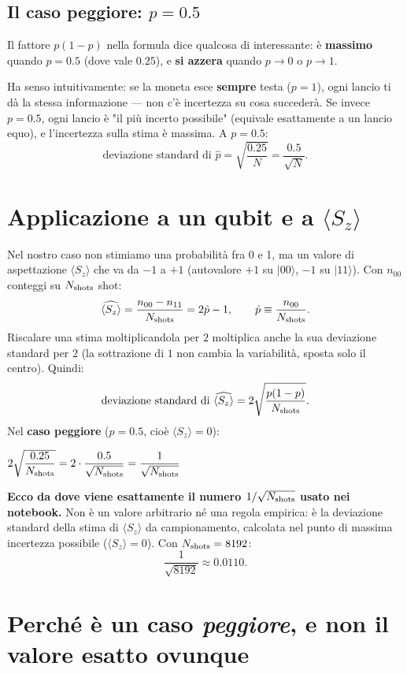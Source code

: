 \documentclass[11pt,a4paper]{article}
\begin{document}
\subsection*{Il caso peggiore: $p=0.5$}

Il fattore $p(1-p)$ nella formula dice qualcosa di interessante: è
\textbf{massimo} quando $p=0.5$ (dove vale $0.25$), e \textbf{si
azzera} quando $p\to0$ o $p\to1$.

Ha senso intuitivamente: se la moneta esce \textbf{sempre} testa
($p=1$), ogni lancio ti dà la stessa informazione --- non c'è
incertezza su cosa succederà. Se invece $p=0.5$, ogni lancio è "il più
incerto possibile" (equivale esattamente a un lancio equo), e
l'incertezza sulla stima è massima. A $p=0.5$:
$$\text{deviazione standard di }\hat p = \sqrt{\frac{0.25}{N}} = \frac{0.5}{\sqrt N}.$$

\section{Applicazione a un qubit e a $\langle S_z\rangle$}

Nel nostro caso non stimiamo una probabilità fra 0 e 1, ma un valore di
aspettazione $\langle S_z\rangle$ che va da $-1$ a $+1$ (autovalore
$+1$ su $|00\rangle$, $-1$ su $|11\rangle$). Con $n_{00}$ conteggi su
$N_{\rm shots}$ shot:
$$\widehat{\langle S_z\rangle} = \frac{n_{00}-n_{11}}{N_{\rm shots}} = 2\hat p - 1, \qquad \hat p \equiv \frac{n_{00}}{N_{\rm shots}}.$$
Riscalare una stima moltiplicandola per $2$ moltiplica anche la sua
deviazione standard per $2$ (la sottrazione di $1$ non cambia la
variabilità, sposta solo il centro). Quindi:
$$\text{deviazione standard di }\widehat{\langle S_z\rangle} = 2\sqrt{\frac{p(1-p)}{N_{\rm shots}}}.$$
Nel \textbf{caso peggiore} ($p=0.5$, cioè $\langle S_z\rangle=0$):
\begin{keyeq}
\centering
$2\sqrt{\dfrac{0.25}{N_{\rm shots}}} = 2\cdot\dfrac{0.5}{\sqrt{N_{\rm shots}}} = \dfrac{1}{\sqrt{N_{\rm shots}}}$
\end{keyeq}

\textbf{Ecco da dove viene esattamente il numero $1/\sqrt{N_{\rm shots}}$
usato nei notebook.} Non è un valore arbitrario né una regola empirica:
è la deviazione standard della stima di $\langle S_z\rangle$ da
campionamento, calcolata nel punto di massima incertezza possibile
($\langle S_z\rangle=0$). Con $N_{\rm shots}=8192$:
$$\frac{1}{\sqrt{8192}} \approx 0.0110.$$

\section{Perché è un caso \emph{peggiore}, e non il valore esatto ovunque}
\end{document}
